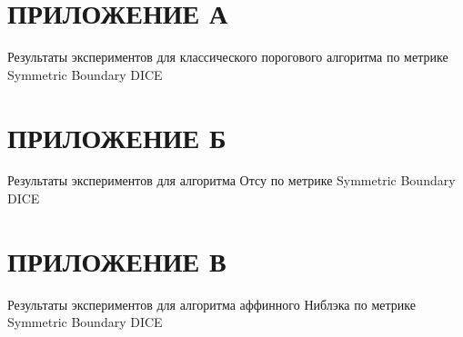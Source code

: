 \appendix
\renewcommand{\thesection}{\Asbuk{section}} 
\renewcommand{\thetable}{\thesection.\arabic{table}} 
\setcounter{table}{0}

\section*{ПРИЛОЖЕНИЕ А}
Результаты экспериментов для классического порогового алгоритма по метрике Symmetric Boundary DICE
\label{app:classicthresholding}



\section*{ПРИЛОЖЕНИЕ Б}
Результаты экспериментов для алгоритма Отсу по метрике Symmetric Boundary DICE
\label{app:otsu}



\section*{ПРИЛОЖЕНИЕ В}
Результаты экспериментов для алгоритма аффинного Ниблэка по метрике Symmetric Boundary DICE
\label{app:niblack}

